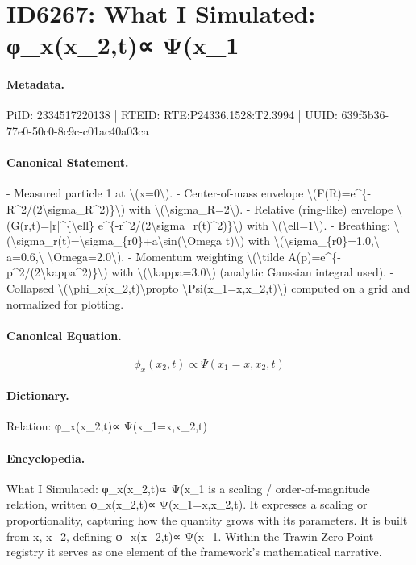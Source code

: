 \section*{ID6267: What I Simulated: φ\_x(x\_2,t)∝ Ψ(x\_1}
\paragraph{Metadata.}
PiID: 2334517220138 | RTEID: RTE:P24336.1528:T2.3994 | UUID: 639f5b36-77e0-50c0-8c9c-c01ac40a03ca

\paragraph{Canonical Statement.}
- Measured particle 1 at \textbackslash{}(x=0\textbackslash{}). - Center-of-mass envelope \textbackslash{}(F(R)=e\textasciicircum{}\{-R\textasciicircum{}2/(2\textbackslash{}sigma\_R\textasciicircum{}2)\}\textbackslash{}) with \textbackslash{}(\textbackslash{}sigma\_R=2\textbackslash{}). - Relative (ring-like) envelope \textbackslash{}(G(r,t)=|r|\textasciicircum{}\{\textbackslash{}ell\} e\textasciicircum{}\{-r\textasciicircum{}2/(2\textbackslash{}sigma\_r(t)\textasciicircum{}2)\}\textbackslash{}) with \textbackslash{}(\textbackslash{}ell=1\textbackslash{}). - Breathing: \textbackslash{}(\textbackslash{}sigma\_r(t)=\textbackslash{}sigma\_\{r0\}+a\textbackslash{}sin(\textbackslash{}Omega t)\textbackslash{}) with \textbackslash{}(\textbackslash{}sigma\_\{r0\}=1.0,\textbackslash{} a=0.6,\textbackslash{} \textbackslash{}Omega=2.0\textbackslash{}). - Momentum weighting \textbackslash{}(\textbackslash{}tilde A(p)=e\textasciicircum{}\{-p\textasciicircum{}2/(2\textbackslash{}kappa\textasciicircum{}2)\}\textbackslash{}) with \textbackslash{}(\textbackslash{}kappa=3.0\textbackslash{}) (analytic Gaussian integral used). - Collapsed \textbackslash{}(\textbackslash{}phi\_x(x\_2,t)\textbackslash{}propto \textbackslash{}Psi(x\_1=x,x\_2,t)\textbackslash{}) computed on a grid and normalized for plotting.

\paragraph{Canonical Equation.}
\[
\phi_x(x_2,t)\propto \Psi(x_1=x,x_2,t)
\]

\paragraph{Dictionary.}
Relation: φ\_x(x\_2,t)∝ Ψ(x\_1=x,x\_2,t)

\paragraph{Encyclopedia.}
What I Simulated: φ\_x(x\_2,t)∝ Ψ(x\_1 is a scaling / order-of-magnitude relation, written φ\_x(x\_2,t)∝ Ψ(x\_1=x,x\_2,t). It expresses a scaling or proportionality, capturing how the quantity grows with its parameters. It is built from x, x\_2, defining φ\_x(x\_2,t)∝ Ψ(x\_1. Within the Trawin Zero Point registry it serves as one element of the framework's mathematical narrative.
